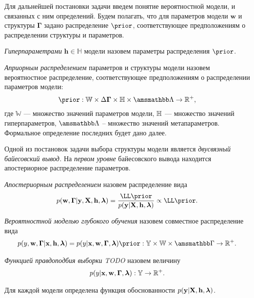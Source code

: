 Для дальнейшей постановки задачи введем понятие вероятностной модели, и связанных с ним определений. Будем полагать, что для параметров модели $\mathbf{w}$ и структуры  $\boldsymbol{\Gamma}$ задано распределение $\prior$, соответствующее предположениям о распределении структуры и параметров. 

\begin{defin}
\textit{Гиперпараметрами} $\mathbf{h}\in \mathbb{H}$ модели  назовем параметры распределения $\prior$.
\end{defin}

\begin{defin}
\textit{Априорным распределением} параметров и структуры модели назовем вероятностное распределение, соответствующее предположениям о распределении параметров модели:
\[
    \prior: \mathbb{W} \times \Delta{\boldsymbol{\Gamma}} \times \mathbb{H} \times \Lamb \to \mathbb{R}^{+}, 
\]
где $\mathbb{W}$ --- множество значений параметров модели, $\mathbb{H}$ --- множество значений гиперпараметров, $\Lamb$ -- множество значений метапараметров. Формальное определение последних будет дано далее.
\end{defin}


Одной из постановок задачи выбора структуры модели является \textit{двусвязный байесовский вывод.} 
На \textit{первом уровне} байесовского вывода  находится апостериорное распределение параметров.

\begin{defin}
\textit{Апостериорным распределением} назовем распределение вида
\begin{equation}
\label{eq:posterior}
    \post = \frac{\LL \prior}{\EV} \propto \LL \prior.%
\end{equation}
\end{defin}

\begin{defin}
\textit{Вероятностной моделью глубокого обучения} назовем совместное распределение вида
\[
    p({y}, \mathbf{w},  \boldsymbol{\Gamma}|\mathbf{x}, \mathbf{h}, \lam) = p({y}|\mathbf{x}, \mathbf{w},  \boldsymbol{\Gamma}, \lam)\prior: \yb \times \mathbb{W}  \times \Gb  \to \mathbb{R}^{+}.
\]
\end{defin}

\begin{defin}
\textit{Функцией правдоподбия выборки TODO} назовем величину
\[
    p(y|\mathbf{x}, \mathbf{w}, \boldsymbol{\Gamma}, \boldsymbol{\lambda}): \mathbb{Y} \to \mathbb{R}^{+}.
\]
\end{defin}
Для каждой модели определена функция обоснованности  $p(\mathbf{y}|\mathbf{X}, \mathbf{h},\boldsymbol{\lambda})$.
 
